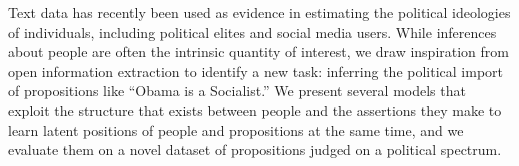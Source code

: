 Text data has recently been used as evidence in estimating the political ideologies of individuals, including political elites and social media users. While inferences about people are often the intrinsic quantity of interest, we draw inspiration from open information extraction to identify a new task: inferring the political import of propositions like ``Obama is a Socialist.'' We present several models that exploit the structure that exists between people and the assertions they make to learn latent positions of people and propositions at the same time, and we evaluate them on a novel dataset of propositions judged on a political spectrum.

